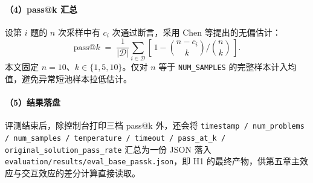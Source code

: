 \paragraph{（4）pass@k 汇总}
设第 $i$ 题的 $n$ 次采样中有 $c_i$ 次通过断言，采用 Chen 等提出的无偏估计：
\[
\mathrm{pass@}k \;=\; \frac{1}{|\mathcal{D}|}\sum_{i \in \mathcal{D}}\!\left[\,1 - \binom{n-c_i}{k}\Big/\binom{n}{k}\,\right].
\]
本文固定 $n{=}10$、$k \in \{1,5,10\}$。仅对 $n$ 等于 \texttt{NUM\_SAMPLES} 的完整样本计入均值，避免异常短池样本拉低估计。

\paragraph{（5）结果落盘}
评测结束后，除控制台打印三档 pass@k 外，还会将 \texttt{timestamp / num\_problems / num\_samples / temperature / timeout / pass\_at\_k / original\_solution\_pass\_rate} 汇总为一份 JSON 落入 \texttt{evaluation/results/eval\_base\_passk.json}，即 H1 的最终产物，供第五章主效应与交互效应的差分计算直接读取。
